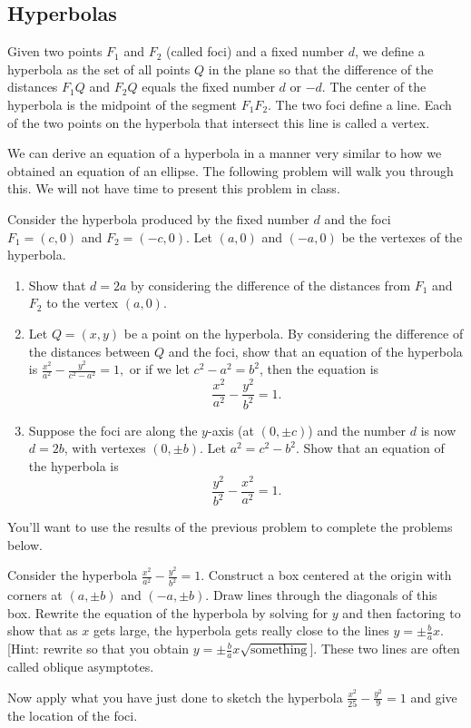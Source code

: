 \subsection{Hyperbolas}

\begin{definition}
Given two points $F_1$ and $F_2$ (called foci) and a fixed number $d$, we define a hyperbola as the set of all points $Q$ in the plane so that the difference of the distances $F_1Q$  and $F_2Q$ equals the fixed number $d$ or $-d$. The center of the hyperbola is the midpoint of the segment $F_1F_2$. The two foci define a line.  Each of the two points on the hyperbola that intersect this line is called a vertex.
\end{definition}

We can derive an equation of a hyperbola in a manner very similar to how we obtained an equation of an ellipse. The following problem will walk you through this.  We will not have time to present this problem in class.

\begin{problem}[Optional]
Consider the hyperbola produced by the fixed number $d$ and the foci $F_1=(c,0)$ and $F_2=(-c,0)$. Let $(a,0)$ and $(-a,0)$ be the vertexes of the hyperbola.
\begin{enumerate}
\item Show that $d=2a$ by considering the difference of the distances from $F_1$ and $F_2$ to the vertex $(a,0)$.
\item Let $Q=(x,y)$ be a point on the hyperbola. By considering the difference of the distances between $Q$ and the foci, show that an equation of the hyperbola is $\frac{x^2}{a^2}-\frac{y^2}{c^2-a^2}=1,$ or if we let $c^2-a^2=b^2$, then the equation is 
$$\frac{x^2}{a^2}-\frac{y^2}{b^2}=1.$$
\item Suppose the foci are along the $y$-axis (at $(0,\pm c)$) and the number $d$ is now $d=2b$, with vertexes $(0,\pm b)$. Let $a^2=c^2-b^2$. Show that an equation of the hyperbola is $$\frac{y^2}{b^2}-\frac{x^2}{a^2}=1.$$
\end{enumerate}
\end{problem}

You'll want to use the results of the previous problem to complete the problems below.

\begin{problem} 
Consider the hyperbola $\frac{x^2}{a^2}-\frac{y^2}{b^2}=1.$ Construct a box centered at the origin with corners at $(a, \pm b)$ and $(-a,\pm b)$.  Draw lines through the diagonals of this box. Rewrite the equation of the hyperbola by solving for $y$ and then factoring to show that as $x$ gets large, the hyperbola gets really close to the lines $y=\pm \frac{b}{a}x$. [Hint:  rewrite so that you obtain $y=\pm\frac{b}{a}x\sqrt{\text{something}}$]. These two lines are often called oblique asymptotes. 

Now apply what you have just done to sketch the hyperbola $\frac{x^2}{25}-\frac{y^2}{9}=1$ and give the location of the foci. 
\end{problem}

